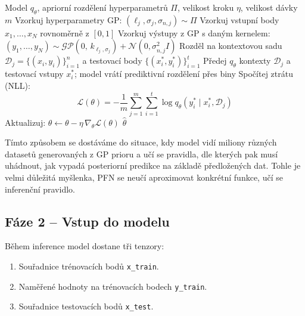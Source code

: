 \begin{algorithm}[!t]
\caption{Meta-trénink sítě PFN na syntetických GP datech}
\label{alg:pfn_training}
\begin{algorithmic}[1]
\Require Model $q_\theta$, apriorní rozdělení hyperparametrů $\Pi$, velikost kroku $\eta$, velikost dávky $m$
        \State Vzorkuj hyperparametry GP: $(\ell_j, \sigma_j, \sigma_{n,j}) \sim \Pi$
        \State Vzorkuj vstupní body $x_1, \ldots, x_N$ rovnoměrně z $[0, 1]$
        \State Vzorkuj výstupy z GP s daným kernelem: $(y_1, \ldots, y_N) \sim \mathcal{GP}(0,\, k_{\ell_j, \sigma_j}) + \mathcal{N}(0, \sigma_{n,j}^2 I)$
        \State Rozděl na kontextovou sadu $\mathcal{D}_j = \{(x_i, y_i)\}_{i=1}^{n}$ a testovací body $\{(x_i^*, y_i^*)\}_{i=1}^{t}$
    \EndFor
    \State Předej $q_\theta$ kontexty $\mathcal{D}_j$ a testovací vstupy $x_i^*$; model vrátí prediktivní rozdělení přes biny
    \State Spočítej ztrátu (NLL):
    \[
        \mathcal{L}(\theta) = -\frac{1}{m}\sum_{j=1}^{m}\sum_{i=1}^{t} \log q_{\theta}(y_i^* \mid x_i^*, \mathcal{D}_j)
    \]
    \State Aktualizuj: $\theta \leftarrow \theta - \eta\,\nabla_\theta \mathcal{L}(\theta)$
\EndWhile
\State \Return $\hat{\theta}$
\end{algorithmic}
\end{algorithm}

Tímto způsobem se dostáváme do situace, kdy model vidí miliony různých datasetů generovaných z GP prioru a učí se pravidla, dle kterých pak musí uhádnout, jak vypadá posteriorní predikce na základě předložených dat.
Tohle je velmi důležitá myšlenka, PFN se neučí aproximovat konkrétní funkce, učí se inferenční pravidlo.

\subsection{Fáze 2 – Vstup do modelu}
\label{subsec:faze2-vstup}
Během inference model dostane tři tenzory: 
\begin{enumerate}
    \item Souřadnice trénovacích bodů \texttt{x\_train}.
    \item Naměřené hodnoty na trénovacích bodech \texttt{y\_train}. 
    \item Souřadnice testovacích bodů \texttt{x\_test}.
\end{enumerate}


